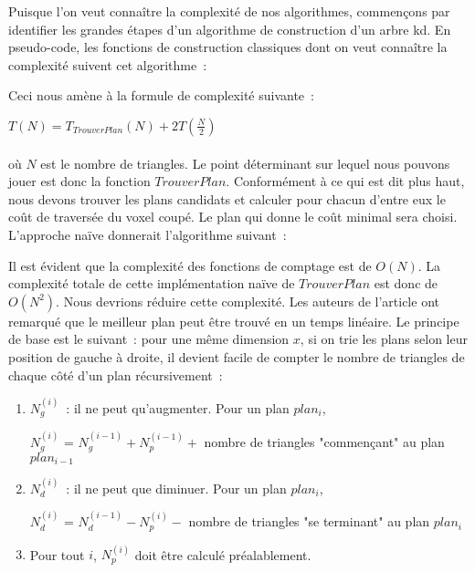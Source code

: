 \documentclass[a4paper]{article}
\begin{document}
Puisque l'on veut connaître la complexité de nos algorithmes, commençons par identifier les grandes étapes d'un algorithme de construction d'un arbre kd. En pseudo-code, les fonctions de construction classiques dont on veut connaître la complexité suivent cet algorithme~:
\begin{function}
\end{function}

Ceci nous amène à la formule de complexité suivante~:

$T(N) = T_{TrouverPlan}(N) + 2T(\frac{N}{2})$
\\\\
où $N$ est le nombre de triangles. Le point déterminant sur lequel nous pouvons jouer est donc la fonction $TrouverPlan$. Conformément à ce qui est dit plus haut, nous devons trouver les plans candidats et calculer pour chacun d'entre eux le coût de traversée du voxel coupé. Le plan qui donne le coût minimal sera choisi. L'approche naïve donnerait l'algorithme suivant~:

\begin{algorithm}
\end{algorithm}

Il est évident que la complexité des fonctions de comptage est de $O(N)$. La complexité totale de cette implémentation naïve de $TrouverPlan$ est donc de $O(N^2)$. Nous devrions réduire cette complexité. Les auteurs de l'article ont remarqué que le meilleur plan peut être trouvé en un temps linéaire. Le principe de base est le suivant~: pour une même dimension $x$, si on trie les plans selon leur position de gauche à droite, il devient facile de compter le nombre de triangles de chaque côté d'un plan récursivement~:
\begin{enumerate}
	\item $N_g^{(i)}$~: il ne peut qu'augmenter. Pour un plan $plan_i$,
	
	$N_g^{(i)}$ = $N_g^{(i-1)} + N_p^{(i-1)} + $ nombre de triangles "commençant" au plan $plan_{i-1}$
	\item $N_d^{(i)}$~: il ne peut que diminuer. Pour un plan $plan_i$,
	
	$N_d^{(i)}$ = $N_d^{(i-1)} - N_p^{(i)} - $ nombre de triangles "se terminant" au plan $plan_i$ 
	\item Pour tout $i$, $N_p^{(i)}$ doit être calculé préalablement.
\end{enumerate}
\end{document}
